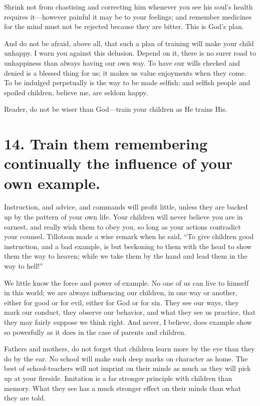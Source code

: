 \documentclass[
]{book}
\begin{document}
Shrink not from chastising and correcting him whenever you see his soul's health requires it---however painful it may be to your feelings; and remember medicines for the mind must not be rejected because they are bitter. This is God's plan.

And do not be afraid, above all, that such a plan of training will make your child unhappy. I warn you against this delusion. Depend on it, there is no surer road to unhappiness than always having our own way. To have our wills checked and denied is a blessed thing for us; it makes us value enjoyments when they come. To be indulged perpetually is the way to be made selfish; and selfish people and spoiled children, believe me, are seldom happy.

Reader, do not be wiser than God---train your children as He trains His.

\hypertarget{train-them-remembering-continually-the-influence-of-your-own-example.}{%
\section*{14. Train them remembering continually the influence of your own example.}\label{train-them-remembering-continually-the-influence-of-your-own-example.}}

Instruction, and advice, and commands will profit little, unless they are backed up by the pattern of your own life. Your children will never believe you are in earnest, and really wish them to obey you, so long as your actions contradict your counsel. Tillotson made a wise remark when he said, ``To give children good instruction, and a bad example, is but beckoning to them with the head to show them the way to heaven; while we take them by the hand and lead them in the way to hell!''

We little know the force and power of example. No one of us can live to himself in this world; we are always influencing our children, in one way or another, either for good or for evil, either for God or for sin. They see our ways, they mark our conduct, they observe our behavior, and what they see us practice, that they may fairly suppose we think right. And never, I believe, does example show so powerfully as it does in the case of parents and children.

Fathers and mothers, do not forget that children learn more by the eye than they do by the ear. No school will make such deep marks on character as home. The best of school-teachers will not imprint on their minds as much as they will pick up at your fireside. Imitation is a far stronger principle with children than memory. What they see has a much stronger effect on their minds than what they are told.
\end{document}
